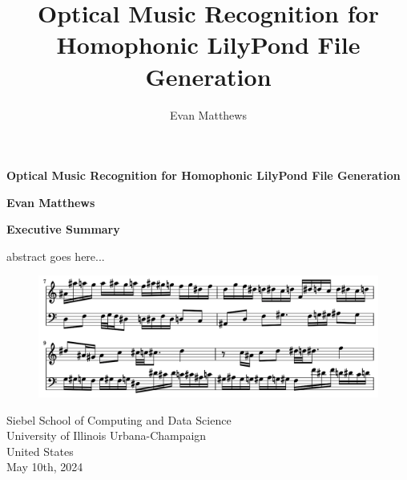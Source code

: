 \documentclass[review,sigconf]{acmart}
\newcommand{\todo}[1]{\textcolor{red}{TODO: #1}}
\begin{document}
\begin{titlepage}
    \begin{center}
        \vspace*{1cm}
            
        \Huge
        \textbf{Optical Music Recognition for Homophonic LilyPond File Generation}
            
        \vspace{0.5cm}
        \LARGE
            
        \vspace{0.5cm}
            
        \textbf{Evan Matthews}

        \vspace{0.9cm}
		\textbf{Executive Summary}

		\vspace{0.5cm}
		abstract goes here...

		\begin{figure}
			\centering
			\includegraphics[width = .8\linewidth]{./figures/cover.png}
		\end{figure}

        \vfill
            
        \vspace{0.8cm}
            
        \Large
        Siebel School of Computing and Data Science\\
        University of Illinois Urbana-Champaign\\
        United States\\
        May 10th, 2024
            
    \end{center}
\end{titlepage}

\title[omr-lilypond-midi]{Optical Music Recognition for Homophonic LilyPond File Generation}
\author{Evan Matthews}

\end{document}
